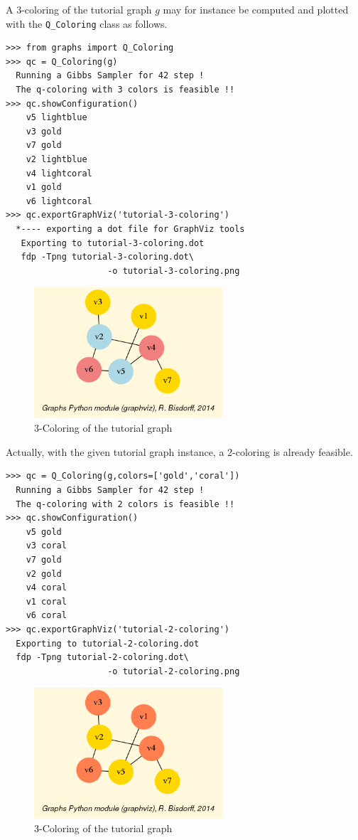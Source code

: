 A 3-coloring of the tutorial graph $g$ may for instance be computed and plotted with the \texttt{Q\_Coloring} class as follows.
\begin{lstlisting}
>>> from graphs import Q_Coloring
>>> qc = Q_Coloring(g)
  Running a Gibbs Sampler for 42 step !
  The q-coloring with 3 colors is feasible !!
>>> qc.showConfiguration()
    v5 lightblue
    v3 gold
    v7 gold
    v2 lightblue
    v4 lightcoral
    v1 gold
    v6 lightcoral
>>> qc.exportGraphViz('tutorial-3-coloring')
  *---- exporting a dot file for GraphViz tools
   Exporting to tutorial-3-coloring.dot
   fdp -Tpng tutorial-3-coloring.dot\
                    -o tutorial-3-coloring.png
\end{lstlisting}
\begin{figure}[h]
\sidecaption
\includegraphics[width=7cm]{Figures/tutorial-3-coloring.png}
\caption{3-Coloring of the tutorial graph} 
\label{fig:21.2}       %
\end{figure}

Actually, with the given tutorial graph instance, a 2-coloring is already feasible.
\begin{lstlisting}
>>> qc = Q_Coloring(g,colors=['gold','coral'])
  Running a Gibbs Sampler for 42 step !
  The q-coloring with 2 colors is feasible !!
>>> qc.showConfiguration()
    v5 gold
    v3 coral
    v7 gold
    v2 gold
    v4 coral
    v1 coral
    v6 coral
>>> qc.exportGraphViz('tutorial-2-coloring')
  Exporting to tutorial-2-coloring.dot
  fdp -Tpng tutorial-2-coloring.dot\
                    -o tutorial-2-coloring.png
\end{lstlisting}
\begin{figure}[h]
\sidecaption
\includegraphics[width=7cm]{Figures/tutorial-2-coloring.png}
\caption{3-Coloring of the tutorial graph} 
\label{fig:21.3}       %
\end{figure}

